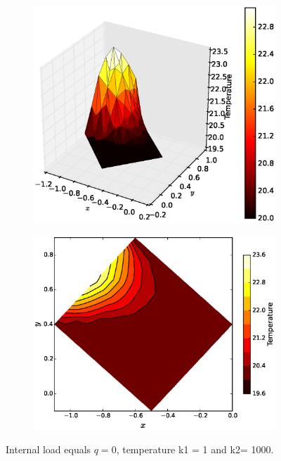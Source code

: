 \documentclass[10pt, a4paper]{article}
\begin{document}
\begin{figure}[H]
\begin{subfigure}[H]{0.45\textwidth}
		\includegraphics[width=\textwidth]{fig/test2_3.eps}
		\caption{}
		\label{fig:3}
	\end{subfigure}
	\begin{subfigure}[H]{0.45\textwidth}
		\includegraphics[width=\textwidth]{fig/test2_4.eps}
		\caption{}
		\label{fig:3}
	\end{subfigure}
	\caption{Internal load equals $q=0$, temperature k1 = 1 and k2= 1000.}
	\label{fig:3_1}
\end{figure}
\end{document}

